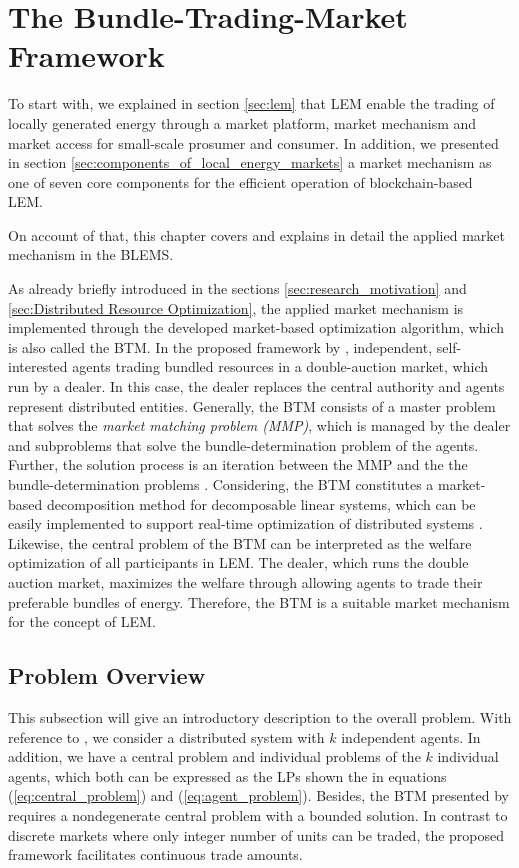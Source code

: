 \section{The Bundle-Trading-Market Framework}
\label{sec:btm}
To start with, we explained in section \ref{sec:lem} that LEM enable the trading 
of locally generated energy through a market platform, market mechanism and market access for 
small-scale prosumer and consumer. 
In addition, we presented in section \ref{sec:components_of_local_energy_markets} 
a market mechanism as one of seven core components for the efficient operation of blockchain-based
LEM.

On account of that, this chapter covers and explains in detail the applied market mechanism in the BLEMS. 

As already briefly introduced in the sections \ref{sec:research_motivation} 
and \ref{sec:Distributed Resource Optimization}, the applied market mechanism is implemented 
through the developed market-based optimization algorithm, which is also called the 
BTM. 
In the proposed framework by , independent, self-interested
agents trading bundled resources in a double-auction market, which run by a dealer. 
In this case, the dealer replaces the central authority and agents represent distributed
entities. Generally, the BTM consists of a master problem that solves the \textit{market matching problem (MMP)}, which is managed by the dealer
and subproblems that solve the bundle-determination problem of the agents.
Further, the solution process is an iteration between the MMP and the 
the bundle-determination problems .
Considering, the BTM constitutes a market-based decomposition method 
for decomposable linear systems,
which can be easily implemented to support real-time optimization 
of distributed systems .
Likewise, the central problem of the BTM can be interpreted as the welfare optimization of all participants in LEM. 
The dealer, which runs the double auction market, maximizes the welfare through allowing 
agents to trade their preferable bundles of energy.
Therefore, the BTM is a suitable market mechanism for the concept of LEM.

\subsection{Problem Overview}
\label{sec:btm_problem_overview}
This subsection will give an introductory description to the overall problem. 
With reference to , we consider a distributed 
system with $k$ independent agents.
In addition, we have a central problem and individual problems of the $k$ individual agents, which both can be expressed as the 
LPs shown the in equations (\ref{eq:central_problem}) and (\ref{eq:agent_problem}). 
Besides, the BTM presented by  requires 
a nondegenerate central problem with a bounded solution. In contrast to discrete markets where 
only integer number of units can be traded, the proposed framework facilitates continuous trade amounts. 


